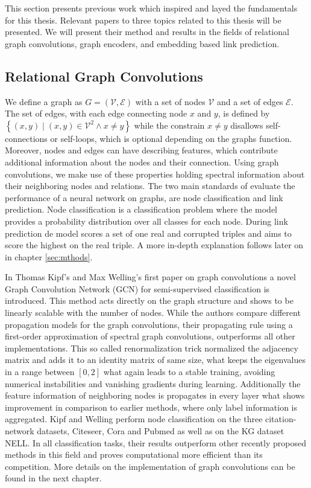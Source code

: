This section presents previous work which inspired and layed the fundamentals for this thesis. Relevant papers to three topics related to this thesis will be presented. We will present their method and results in the fields of relational graph convolutions, graph encoders, and embedding based link prediction.

\subsection{Relational Graph Convolutions}
We define a graph as $G=(\mathcal{V}, \mathcal{E})$  with a set of nodes $\mathcal{V}$ and a set of edges $\mathcal{E}$. The set of edges, with each edge connecting node $x$ and $y$, is defined by $\left\{(x, y) \mid(x, y) \in \mathcal{V}^{2} \wedge x \neq y\right\}$ while the constrain $x \neq y$ disallows self-connections or self-loops, which is optional depending on the graphs function. Moreover, nodes and edges can have describing features, which contribute additional information about the nodes and their connection. Using graph convolutions, we make use of these properties holding spectral information about their neighboring nodes and relations. The two main standards of evaluate the performance of a neural network on graphs, are node classification and link prediction. Node classification is a classification problem where the model provides a probability distribution over all classes for each node. During link prediction de model scores a set of one real and corrupted triples and aims to score the highest on the real triple. A more in-depth explanation follows later on in chapter \ref{sec:mthods}.

In Thomas Kipf's and Max Welling's first paper on graph convolutions \cite{kipf_semi-supervised_2017} a novel Graph Convolution Network (GCN) for semi-supervised classification is introduced. This method acts directly on the graph structure and shows to be linearly scalable with the number of nodes. While the authors compare different propagation models for the graph convolutions, their propagating rule using a first-order approximation of spectral graph convolutions, outperforms all other implementations. This so called renormalization trick normalized the adjacency matrix and adds it to an identity matrix of same size, what keeps the eigenvalues in a range between $[0,2]$ what again leads to a stable training, avoiding numerical instabilities and vanishing gradients during learning. Additionally the feature information of neighboring nodes is propagates in every layer what shows improvement in comparison to earlier methods, where only label information is aggregated.
Kipf and Welling perform node classification on the three citation-network datasets, Citeseer, Cora and Pubmed as well as on the KG dataset NELL. In all classification tasks, their results outperform other recently proposed methods in this field and proves computational more efficient than its competition. More details on the implementation of graph convolutions can be found in the next chapter. 


